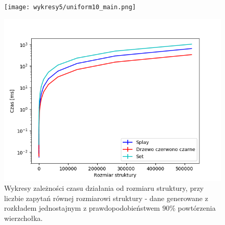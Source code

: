 \documentclass[declaration,shortabstract]{iithesis}
\theoremstyle{thm}
\theoremstyle{remark}
\theoremstyle{plain}
\theoremstyle{plain}
\theoremstyle{plain}
\begin{document}
\begin{figure}[H]
\begin{minipage}[b]{.45\textwidth}
\centering
\texttt{[image: wykresy5/uniform10\_main.png]}
\end{minipage}
\hfill
\begin{minipage}[b]{.45\textwidth}
\centering
\includegraphics[width=1\textwidth]{wykresy3/uniform10_main.png}
\end{minipage}
\caption{Wykresy zależności czasu działania od rozmiaru struktury, przy liczbie zapytań równej rozmiarowi struktury - dane generowane z rozkładem jednostajnym z prawdopodobieństwem  \(90\%\) powtórzenia wierzchołka.}
\end{figure}
\end{document}
